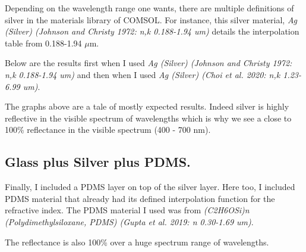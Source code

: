 Depending on the wavelength range one wants, there are multiple definitions of silver in the materials library of COMSOL. For instance, this silver material, \emph{Ag (Silver) (Johnson and Christy 1972: n,k 0.188-1.94 um)} details the interpolation table from 0.188-1.94 $\mu$m.

Below are the results first when I used \emph{Ag (Silver) (Johnson and Christy 1972: n,k 0.188-1.94 um)} and then when I used \emph{Ag (Silver) (Choi et al. 2020: n,k 1.23-6.99 um)}.





The graphs above are a tale of mostly expected results. Indeed silver is highly reflective in the visible spectrum of wavelengths which is why we see a close to 100\% reflectance in the visible spectrum (400 - 700 nm).

\subsection{Glass plus Silver plus PDMS.}
Finally, I included a PDMS layer on top of the silver layer. Here too, I included PDMS material that already had its defined interpolation function for the refractive index. The PDMS material I used was from \emph{(C2H6OSi)n (Polydimethylsiloxane, PDMS) (Gupta et al. 2019: n 0.30-1.69 um)}.



The reflectance is also 100\% over a huge spectrum range of wavelengths.
